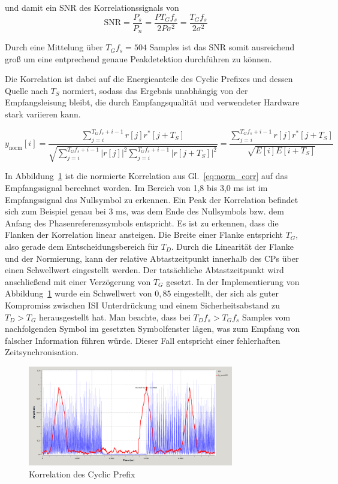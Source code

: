 und damit ein SNR des Korrelationssignals von
\begin{equation}
\text{SNR} = \frac{P_s}{P_n} = \frac{P T_G f_s}{2 P \sigma^2} = \frac{T_G f_s}{2 \sigma^2}
\end{equation}

Durch eine Mittelung über $T_G f_s = 504$ Samples ist das SNR somit ausreichend groß um eine entprechend genaue Peakdetektion durchführen zu können.

Die Korrelation ist dabei auf die Energieanteile des Cyclic Prefixes und dessen Quelle nach $T_S$ normiert, sodass das Ergebnis unabhängig von der Empfangsleisung bleibt, die durch Empfangsqualität und verwendeter Hardware stark variieren kann.

\begin{equation}
    y_{\text{norm}}[i] = \frac{\sum \limits_{j=i}^{T_G f_s + i - 1}r[j] r^*[j+T_S]}{\sqrt{\sum \limits_{j=i}^{T_G f_s + i - 1}|r[j]|^2 \sum \limits_{j=i}^{T_G f_s + i - 1}|r[j+T_S]|^2}} = \frac{\sum \limits_{j=i}^{T_G f_s + i - 1}r[j] r^*[j+T_S]}{\sqrt{E[i]E[i+T_S]}}
    \label{eq:norm_corr}
\end{equation}

In Abbildung~\ref{fig:corr} ist die normierte Korrelation aus Gl.~\ref{eq:norm_corr} auf das Empfangssignal berechnet worden. Im Bereich von 1,8 bis 3,0 ms ist im Empfangssignal das Nullsymbol zu erkennen. Ein Peak der Korrelation befindet sich zum Beispiel genau bei 3 ms, was dem Ende des Nullsymbols bzw. dem Anfang des Phasenreferenzsymbols entspricht. Es ist zu erkennen, dass die Flanken der Korrelation linear ansteigen. Die Breite einer Flanke entspricht $T_G$, also gerade dem Entscheidungsbereich für $T_D$. Durch die Linearität der Flanke und der Normierung, kann der relative Abtastzeitpunkt innerhalb des CPs über einen Schwellwert eingestellt werden. Der tatsächliche Abtastzeitpunkt wird anschließend mit einer Verzögerung von $T_G$ gesetzt. In der Implementierung von Abbildung~\ref{fig:corr} wurde ein Schwellwert von $0,85$ eingestellt, der sich als guter Kompromiss zwischen \ac{ISI} Unterdrückung und einem Sicherheitsabstand zu $T_D > T_G$ herausgestellt hat. Man beachte, dass bei $T_D f_s > T_G f_s$ Samples vom nachfolgenden Symbol im gesetzten Symbolfenster lägen, was zum Empfang von falscher Information führen würde. Dieser Fall entspricht einer fehlerhaften Zeitsynchronisation.

\begin{figure}[h]
\centering
  \includegraphics[width=0.8\textwidth]{figures/delayed_correlation_abs_and_energy.png}
	\caption{Korrelation des Cyclic Prefix}
	\label{fig:corr}
\end{figure}

